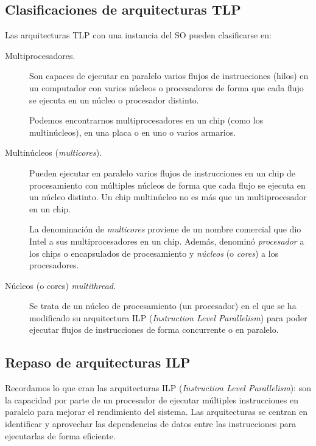 \subsection{Clasificaciones de arquitecturas TLP}
Las arquitecturas TLP con una instancia del SO pueden clasificarse en:
\begin{description}
    \item [Multiprocesadores.] Son capaces de ejecutar en paralelo varios flujos de instrucciones (hilos) en un computador con varios núcleos o procesadores de forma que cada flujo se ejecuta en un núcleo o procesador distinto. 

        Podemos encontrarnos multiprocesadores en un chip (como los multinúcleos), en una placa o en uno o varios armarios.
    \item [Multinúcleos (\emph{multicores}).] Pueden ejecutar en paralelo varios flujos de instrucciones en un chip de procesamiento con múltiples núcleos de forma que cada flujo se ejecuta en un núcleo distinto. Un chip multinúcleo no es más que un multiprocesador en un chip. 

        La denominación de \emph{multicores} proviene de un nombre comercial que dio Intel a sus multiprocesadores en un chip. Además, denominó \emph{procesador} a los chips o encapsulados de procesamiento y \emph{núcleos} (o \emph{cores}) a los procesadores.
    \item [Núcleos (o cores) \emph{multithread}.] Se trata de un núcleo de procesamiento (un procesador) en el que se ha modificado su arquitectura ILP (\emph{Instruction Level Parallelism}) para poder ejecutar flujos de instrucciones de forma concurrente o en paralelo.
\end{description}

\subsection{Repaso de arquitecturas ILP}
Recordamos lo que eran las arquitecturas ILP (\emph{Instruction Level Parallelism}): son la capacidad por parte de un procesador de ejecutar múltiples instrucciones en paralelo para mejorar el rendimiento del sistema. Las arquitecturas se centran en identificar y aprovechar las dependencias de datos entre las instrucciones para ejecutarlas de forma eficiente.

